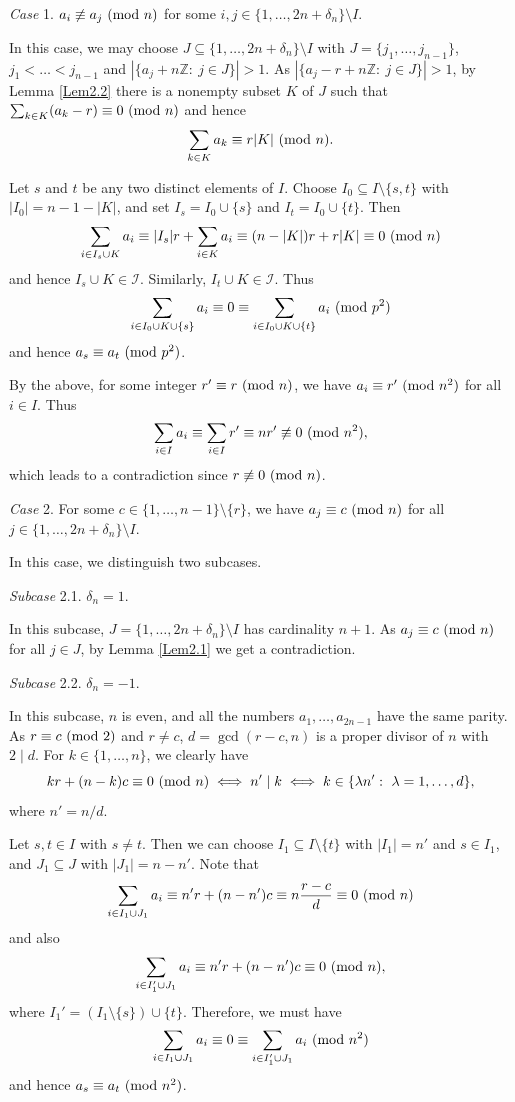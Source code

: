\documentclass[11pt,reqno]{amsart}
\def\pmod #1{\ ({\rm{mod}}\ #1)}
\def\Z{\mathbb Z}
\def\f{\frac}
\def\se {\subseteq}
\def\sm{\setminus}
\def\eq{\equiv}
\def\da{\delta}
\theoremstyle{plain}
\theoremstyle{definition}
\theoremstyle{remark}
\begin{document}
 {\it Case} 1.  $a_i\not\eq a_j\pmod n$ for some $i,j\in\{1,\ldots,2n+\da_n\}\sm I$.

In this case, we may choose $J\se\{1,\ldots,2n+\da_n\}\sm I$
with $J=\{j_1,\ldots,j_{n-1}\}$, $j_1<\ldots<j_{n-1}$ and $|\{a_j+n\Z:\ j\in J\}|>1$. As $|\{a_j-r+n\Z:\ j\in J\}|>1$,
by Lemma \ref{Lem2.2} there is a nonempty subset $K$ of $J$ such that
 $\sum_{k\in K}(a_k-r)\eq0\pmod n$ and hence
$$\sum_{k\in K}a_k\eq r|K|\pmod n.$$

Let $s$ and $t$ be any two distinct elements of $I$. Choose $I_0\se I\sm\{s,t\}$ with $|I_0|=n-1-|K|$,
and set $I_s=I_0\cup \{s\}$ and $I_t=I_0\cup\{t\}$. Then
$$\sum_{i\in I_s\cup K}a_i\eq |I_s|r+\sum_{i\in K}a_i\eq(n-|K|)r+r|K|\eq0\pmod n$$
and hence $I_s\cup K\in\mathcal I$. Similarly, $I_t\cup K\in\mathcal I$. Thus
$$\sum_{i\in I_0\cup K\cup\{s\}}a_i\eq0\eq\sum_{i\in I_0\cup K\cup\{t\}}a_i\pmod{p^2}$$
and hence $a_s\eq a_t\pmod {p^2}$.

By the above, for some integer $r'\eq r\pmod n$, we have $a_i\eq r'\pmod{n^2}$ for all $i\in I$.
Thus
$$\sum_{i\in I}a_i\eq\sum_{i\in I}r'\eq nr'\not\eq0\pmod{n^2},$$
which leads to a contradiction since $r\not\eq0\pmod n$.

{\it Case} 2. For some $c\in\{1,\ldots,n-1\}\sm\{r\}$, we have $a_j\eq c\pmod n$ for all $j\in\{1,\ldots,2n+\da_n\}\sm I$.

In this case, we distinguish two subcases.

{\it Subcase} 2.1. $\da_n=1$.

In this subcase,  $J=\{1,\ldots,2n+\da_n\}\sm I$
has cardinality $n+1$. As $a_j\eq c\pmod n$ for all $j\in J$,
by Lemma \ref{Lem2.1} we get a contradiction.

{\it Subcase} 2.2. $\da_n=-1$.

In this subcase, $n$ is even, and all the numbers $a_1,\ldots,a_{2n-1}$ have the same parity.
As $r\eq c\pmod 2$ and $r\not=c$, $d=\gcd(r-c,n)$ is a proper divisor of $n$ with $2\mid d$.
For $k\in\{1,\ldots,n\}$, we clearly have
$$kr+(n-k)c\eq0\pmod n\iff n'\mid k\iff k\in\{\lambda n':\ \lambda=1,\ldots,d\},$$
where $n'=n/d$.

Let $s,t\in I$ with $s\not=t$. Then we can choose $I_1\se I\sm\{t\}$ with $|I_1|=n'$ and $s\in I_1$,
and $J_1\se J$
with $|J_1|=n-n'$. Note that
$$\sum_{i\in I_1\cup J_1}a_i\eq n'r+(n-n')c\eq n\f{r-c}d\eq0\pmod n$$
and also
$$\sum_{i\in I_1'\cup J_1}a_i\eq n'r+(n-n')c\eq0\pmod n,$$
where $I_1'=(I_1\sm\{s\})\cup\{t\}$.
Therefore, we must have
\begin{equation}\label{I1J}\sum_{i\in I_1\cup J_1}a_i\eq0\eq\sum_{i\in I_1'\cup J_1}a_i\pmod{n^2}
\end{equation}
and hence $a_s\eq a_t\pmod{n^2}$.
\end{document}
